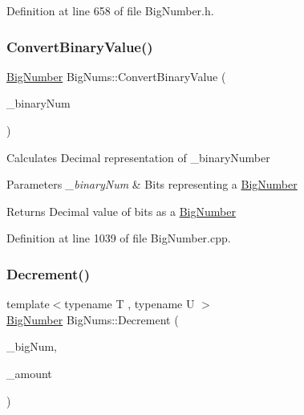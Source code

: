 Definition at line 658 of file Big\+Number.\+h.

\mbox{\label{namespace_big_nums_ad3c1a55de2f548036c5f3888c2b4061d}} 
\subsubsection{\texorpdfstring{ConvertBinaryValue()}{ConvertBinaryValue()}}
{\footnotesize\ttfamily \mbox{\hyperlink{class_big_nums_1_1_big_number}{Big\+Number}} Big\+Nums\+::\+Convert\+Binary\+Value (\begin{DoxyParamCaption}\item[{const \mbox{\hyperlink{class_big_nums_1_1_big_number}{Big\+Number}} \&}]{\+\_\+binary\+Num }\end{DoxyParamCaption})}

Calculates Decimal representation of \+\_\+binary\+Number 
\begin{DoxyParams}{Parameters}
{\em \+\_\+binary\+Num} & Bits representing a \mbox{\hyperlink{class_big_nums_1_1_big_number}{Big\+Number}} \\
\hline
\end{DoxyParams}
\begin{DoxyReturn}{Returns}
Decimal value of bits as a \mbox{\hyperlink{class_big_nums_1_1_big_number}{Big\+Number}} 
\end{DoxyReturn}


Definition at line 1039 of file Big\+Number.\+cpp.

\mbox{\label{namespace_big_nums_a5ade9d910a990dfe7a21a3015d2a523a}} 
\subsubsection{\texorpdfstring{Decrement()}{Decrement()}}
{\footnotesize\ttfamily template$<$typename T , typename U $>$ \\
\mbox{\hyperlink{class_big_nums_1_1_big_number}{Big\+Number}} Big\+Nums\+::\+Decrement (\begin{DoxyParamCaption}\item[{T \&}]{\+\_\+big\+Num,  }\item[{const U \&}]{\+\_\+amount }\end{DoxyParamCaption})}

